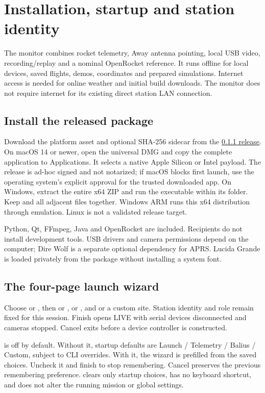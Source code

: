 \section{Installation, startup and station identity}\label{sec:scope}
The monitor combines rocket telemetry, Away antenna pointing, local USB video,
recording/replay and a nominal OpenRocket reference. It runs offline for local
devices, saved flights, demos, coordinates and prepared simulations. Internet
access is needed for online weather and initial build downloads. The monitor
does not require internet for its existing direct station LAN connection.

\subsection{Install the released package}
Download the platform asset and optional SHA-256 sidecar from the
\href{https://github.com/MIT-Rocket-Team/RT_Telemetry_UI/releases/tag/v0.1.1}{0.1.1 release}.
On macOS 14 or newer, open the universal DMG and copy the complete application
to Applications. It selects a native Apple Silicon or Intel payload.
The release is ad-hoc signed and not notarized; if macOS blocks first launch,
use the operating system's explicit approval for the trusted downloaded app.
On Windows, extract the entire x64 ZIP and run the executable within its folder.
Keep  and all adjacent files together. Windows ARM runs this
x64 distribution through emulation. Linux is not a validated release target.

Python, Qt, FFmpeg, Java and OpenRocket are included. Recipients do not install
development tools. USB drivers and camera permissions depend on the computer;
Dire Wolf is a separate optional dependency for APRS. Lucida Grande is loaded
privately from the package without installing a system font.

\subsection{The four-page launch wizard}
Choose  or , then  or
,  or , and  or a custom site.
Station identity and role remain fixed for this session. Finish opens LIVE
with serial devices disconnected and cameras stopped. Cancel exits before a
device controller is constructed.

 is off by default. Without it, startup
defaults are Launch / Telemetry / Balius / Custom, subject to CLI overrides.
With it, the wizard is prefilled from the saved choices. Uncheck it and finish
to stop remembering. Cancel preserves the previous remembering preference.
 clears only startup choices, has
no keyboard shortcut, and does not alter the running mission or global settings.

